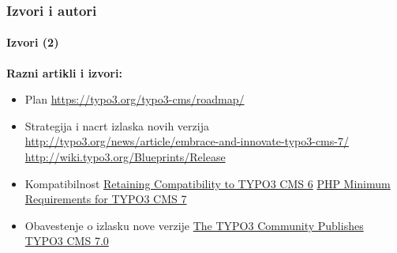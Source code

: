 \begin{frame}[fragile]
	\frametitle{Izvori i autori}
	\framesubtitle{Izvori (2)}

	\textbf{Razni artikli i izvori:}
		\begin{itemize}\smaller

			\item Plan\newline
				\url{https://typo3.org/typo3-cms/roadmap/}
			\item Strategija i nacrt izlaska novih verzija\newline
				\url{http://typo3.org/news/article/embrace-and-innovate-typo3-cms-7/}
				\url{http://wiki.typo3.org/Blueprints/Release}
			\item Kompatibilnost\newline
				\href{http://typo3.org/news/article/retaining-compatibility-to-typo3-cms6/}{Retaining Compatibility to TYPO3 CMS 6}\newline
				\href{http://typo3.org/news/article/php-minimum-requirements-for-typo3-cms-7/}{PHP Minimum Requirements for TYPO3 CMS 7}
			\item Obavestenje o izlasku nove verzije\newline
				\href{http://typo3.org/news/article/the-typo3-community-publishes-typo3-cms-70-a-new-version-of-its-free-content-management-system/}{The TYPO3 Community Publishes TYPO3 CMS 7.0}

		\end{itemize}

\end{frame}


